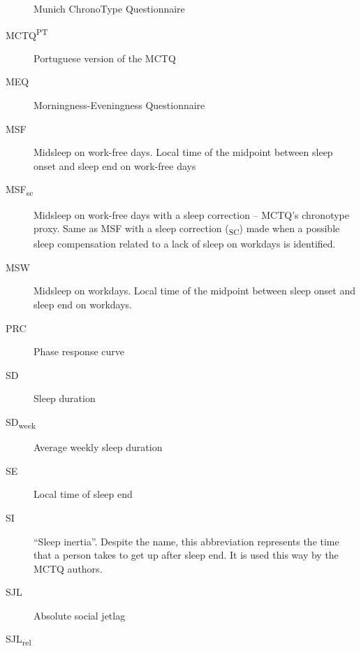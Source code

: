 \begin{siglas}
\begin{description}
Munich ChronoType Questionnaire
\item[MCTQ\textsuperscript{PT}]
\hspace{20cm}

Portuguese version of the MCTQ
\item[MEQ]
\hspace{20cm}

Morningness-Eveningness Questionnaire
\item[MSF]
\hspace{20cm}

Midsleep on work-free days. Local time of the midpoint between sleep
onset and sleep end on work-free days
\item[MSF\textsubscript{sc}]
\hspace{20cm}

Midsleep on work-free days with a sleep correction -- MCTQ's chronotype
proxy. Same as MSF with a sleep correction (\textsubscript{SC}) made
when a possible sleep compensation related to a lack of sleep on
workdays is identified.
\item[MSW]
\hspace{20cm}

Midsleep on workdays. Local time of the midpoint between sleep onset and
sleep end on workdays.
\item[PRC]
\hspace{20cm}

Phase response curve
\item[SD]
\hspace{20cm}

Sleep duration
\item[SD\textsubscript{week}]
\hspace{20cm}

Average weekly sleep duration
\item[SE]
\hspace{20cm}

Local time of sleep end
\item[SI]
\hspace{20cm}

``Sleep inertia''. Despite the name, this abbreviation represents the
time that a person takes to get up after sleep end. It is used this way
by the MCTQ authors.
\item[SJL]
\hspace{20cm}

Absolute social jetlag
\item[SJL\textsubscript{rel}]
\hspace{20cm}


\end{description}
\end{siglas}
